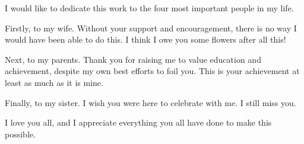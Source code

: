 \vspace*{3cm}
\noindent I would like to dedicate this work to the four most important people in my life.

\vspace{1.5cm}
\noindent Firstly, to my wife. Without your support and encouragement, there is no way I would have been able to do this. I think I owe you some flowers after all this!

\vspace{1cm}
\noindent Next, to my parents. Thank you for raising me to value education and achievement, despite my own best efforts to foil you. This is your achievement at least as much as it is mine. 

\vspace{1cm}
\noindent Finally, to my sister. I wish you were here to celebrate with me. I still miss you. 

\vspace{1cm}
\noindent I love you all, and I appreciate everything you all have done to make this possible. 
